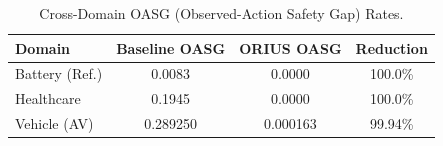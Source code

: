 \begin{table}[htbp]
\centering
\caption{Cross-Domain OASG (Observed-Action Safety Gap) Rates.}
\label{tbl:cross_domain_oasg}
\begin{tabular}{lccc}
\toprule
\textbf{Domain} & \textbf{Baseline OASG} & \textbf{ORIUS OASG} & \textbf{Reduction} \\
\midrule
Battery (Ref.) & 0.0083 & 0.0000 & 100.0\% \\
Healthcare & 0.1945 & 0.0000 & 100.0\% \\
Vehicle (AV) & 0.289250 & 0.000163 & 99.94\% \\
\bottomrule
\end{tabular}
\end{table}
